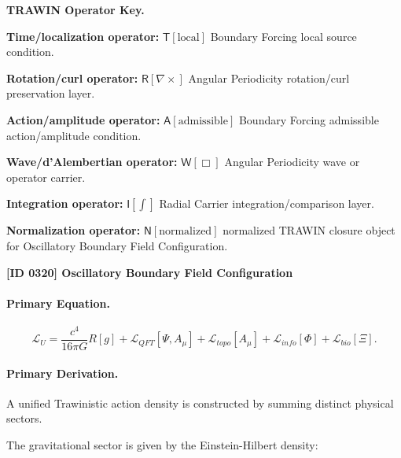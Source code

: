 \par\vspace{0.45\baselineskip}
\noindent\begin{minipage}[t]{\linewidth}
\begingroup
\small
\raggedright
\textbf{TRAWIN Operator Key.}\par
\noindent\textbf{Time/localization operator:} $\mathsf{T}\!\left[\mathrm{local}\right]$ Boundary Forcing local source condition.\par
\noindent\textbf{Rotation/curl operator:} $\mathsf{R}\!\left[\nabla\times\right]$ Angular Periodicity rotation/curl preservation layer.\par
\noindent\textbf{Action/amplitude operator:} $\mathsf{A}\!\left[\mathrm{admissible}\right]$ Boundary Forcing admissible action/amplitude condition.\par
\noindent\textbf{Wave/d'Alembertian operator:} $\mathsf{W}\!\left[\Box\right]$ Angular Periodicity wave or operator carrier.\par
\noindent\textbf{Integration operator:} $\mathsf{I}\!\left[\int\right]$ Radial Carrier integration/comparison layer.\par
\noindent\textbf{Normalization operator:} $\mathsf{N}\!\left[\mathrm{normalized}\right]$ normalized TRAWIN closure object for Oscillatory Boundary Field Configuration.\par
\endgroup
\end{minipage}

\clearpage
\noindent\textbf{[ID 0320] Oscillatory Boundary Field Configuration}\par
\vspace{0.35em}
\paragraph{Primary Equation.}
\begin{equation}
\mathcal{L}_U
=
\frac{c^4}{16\pi G}R[g]
+
\mathcal{L}_{QFT}[\Psi,A_\mu]
+
\mathcal{L}_{topo}[A_\mu]
+
\mathcal{L}_{info}[\Phi]
+
\mathcal{L}_{bio}[\Xi].
\end{equation}

\paragraph{Primary Derivation.}
A unified Trawinistic action density is constructed by summing distinct physical sectors.

The gravitational sector is given by the Einstein-Hilbert density:

